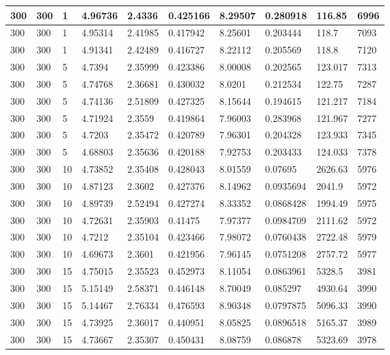\begin{landscape}
\begin{longtable}{ | l | l | l | l | l | l | l | l | l | l | }
300 & 300 & 1 & 4.96736 & 2.4336 & 0.425166 & 8.29507 & 0.280918 & 116.85 & 6996\\ \hline
300 & 300 & 1 & 4.95314 & 2.41985 & 0.417942 & 8.25601 & 0.203444 & 118.7 & 7093\\ \hline
300 & 300 & 1 & 4.91341 & 2.42489 & 0.416727 & 8.22112 & 0.205569 & 118.8 & 7120\\ \hline
300 & 300 & 5 & 4.7394 & 2.35999 & 0.423386 & 8.00008 & 0.202565 & 123.017 & 7313\\ \hline
300 & 300 & 5 & 4.74768 & 2.36681 & 0.430032 & 8.0201 & 0.212534 & 122.75 & 7287\\ \hline
300 & 300 & 5 & 4.74136 & 2.51809 & 0.427325 & 8.15644 & 0.194615 & 121.217 & 7184\\ \hline
300 & 300 & 5 & 4.71924 & 2.3559 & 0.419864 & 7.96003 & 0.283968 & 121.967 & 7277\\ \hline
300 & 300 & 5 & 4.7203 & 2.35472 & 0.420789 & 7.96301 & 0.204328 & 123.933 & 7345\\ \hline
300 & 300 & 5 & 4.68803 & 2.35636 & 0.420188 & 7.92753 & 0.203433 & 124.033 & 7378\\ \hline
300 & 300 & 10 & 4.73852 & 2.35408 & 0.428043 & 8.01559 & 0.07695 & 2626.63 & 5976\\ \hline
300 & 300 & 10 & 4.87123 & 2.3602 & 0.427376 & 8.14962 & 0.0935694 & 2041.9 & 5972\\ \hline
300 & 300 & 10 & 4.89739 & 2.52494 & 0.427274 & 8.33352 & 0.0868428 & 1994.49 & 5975\\ \hline
300 & 300 & 10 & 4.72631 & 2.35903 & 0.41475 & 7.97377 & 0.0984709 & 2111.62 & 5972\\ \hline
300 & 300 & 10 & 4.7212 & 2.35104 & 0.423466 & 7.98072 & 0.0760438 & 2722.48 & 5979\\ \hline
300 & 300 & 10 & 4.69673 & 2.3601 & 0.421956 & 7.96145 & 0.0751208 & 2757.72 & 5977\\ \hline
300 & 300 & 15 & 4.75015 & 2.35523 & 0.452973 & 8.11054 & 0.0863961 & 5328.5 & 3981\\ \hline
300 & 300 & 15 & 5.15149 & 2.58371 & 0.446148 & 8.70049 & 0.085297 & 4930.64 & 3990\\ \hline
300 & 300 & 15 & 5.14467 & 2.76334 & 0.476593 & 8.90348 & 0.0797875 & 5096.33 & 3990\\ \hline
300 & 300 & 15 & 4.73925 & 2.36017 & 0.440951 & 8.05825 & 0.0896518 & 5165.37 & 3989\\ \hline
300 & 300 & 15 & 4.73667 & 2.35307 & 0.450431 & 8.08759 & 0.086878 & 5323.69 & 3978\\ \hline

\end{longtable}
\end{landscape}

